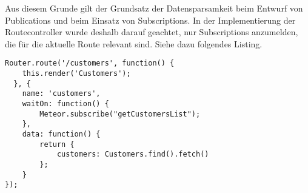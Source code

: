 Aus diesem Grunde gilt der Grundsatz der Datensparsamkeit beim Entwurf von
Publications und beim Einsatz von Subscriptions. In der Implementierung der
Routecontroller wurde deshalb darauf geachtet, nur Subscriptions anzumelden, die
für die aktuelle Route relevant sind. Siehe dazu folgendes Listing.

\begin{lstlisting}[caption=Auszug aus Routecontroller für Route 'customers']
Router.route('/customers', function() {
  	this.render('Customers');
  }, {
  	name: 'customers',
  	waitOn: function() {
  		Meteor.subscribe("getCustomersList");
  	},
  	data: function() {
  		return {
  			customers: Customers.find().fetch()
  		};
  	}
});
\end{lstlisting}
